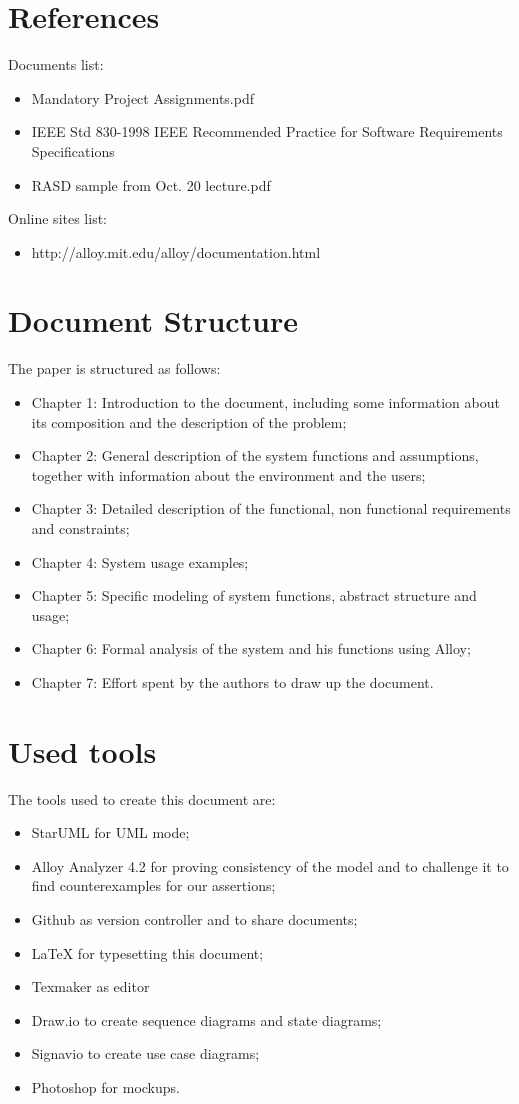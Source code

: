 \section{References}
Documents list:
\begin{itemize}
\item Mandatory Project Assignments.pdf
\item IEEE Std 830-1998 IEEE Recommended Practice for Software Requirements
Specifications
\item RASD sample from Oct. 20 lecture.pdf
\end{itemize}
Online sites list:
\begin{itemize}
\item http://alloy.mit.edu/alloy/documentation.html
\end{itemize}
%
%
\section{Document Structure}
The paper is structured as follows:
\begin{itemize}
\item Chapter 1: Introduction to the document, including some information about its composition and the description of the problem;
\item Chapter 2: General description of the system functions and assumptions, together with information about the environment and the users;
\item Chapter 3: Detailed description of the functional, non functional requirements and constraints;
\item Chapter 4: System usage examples; 
\item Chapter 5: Specific modeling of system functions, abstract structure and usage;
\item Chapter 6: Formal analysis of the system and his functions using Alloy;
\item Chapter 7: Effort spent by the authors to draw up the document.
\end{itemize}
%
%
\section{Used tools}
The tools used to create this document are:
\begin{itemize}
\item StarUML for UML mode;
\item Alloy Analyzer 4.2 for proving consistency of the model and to challenge it to find counterexamples for our assertions;
\item Github as version controller and to share documents;
\item LaTeX for typesetting this document;
\item Texmaker as editor
\item Draw.io to create sequence diagrams and state diagrams;
\item Signavio to create use case diagrams;
\item Photoshop for mockups.
\end{itemize}
%
